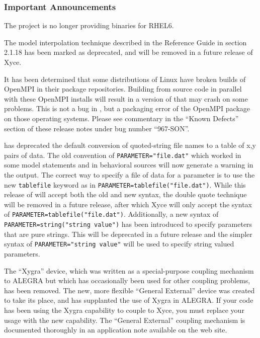 \documentclass[letterpaper]{scrartcl}
\begin{document}
\subsubsection*{Important Announcements}
\begin{XyceItemize}
\item The \Xyce{} project is no longer providing binaries for RHEL6.
\item The model interpolation technique described in the \Xyce{}
  Reference Guide in section 2.1.18 has been marked as deprecated, and
  will be removed in a future release of Xyce.
\item It has been determined that some distributions of Linux have
  broken builds of OpenMPI in their package repositories.  Building
  \Xyce{} from source code in parallel with these OpenMPI installs
  will result in a version of \Xyce{} that may crash on some problems.
  This is not a bug in \Xyce{}, but a packaging error of the OpenMPI
  package on those operating systems.  Please see commentary in the
  ``Known Defects'' section of these release notes under bug number
  ``967-SON''.
\item \Xyce{} has deprecated the default conversion of quoted-string file
  names to a table of x,y pairs of data.  The old convention of
  \texttt{PARAMETER="file.dat"} which worked in some model statements
  and in behavioral sources will now generate a warning in the \Xyce{}
  output.  The correct way to specify a file of data for a parameter
  is to use the new \texttt{tablefile} keyword as in
  \texttt{PARAMETER=tablefile("file.dat")}.  While this release of
  \Xyce{} will accept both the old and new syntax, the double quote
  technique will be removed in a future release, after which Xyce
  will only accept the syntax of
  \texttt{PARAMETER=tablefile("file.dat")}.  Additionally, a new
  syntax of \texttt{PARAMETER=string("string value")} has been
  introduced to specify parameters that are pure strings.  This will
  be deprecated in a future release and the simpler syntax of
  \texttt{PARAMETER="string value"} will be used to specify string
  valued parameters.
\item The ``Xygra'' device, which was written as a special-purpose
  coupling mechanism to ALEGRA but which has occasionally been used
  for other coupling problems, has been removed.  The new, more
  flexible ``General External'' device was created to take its place,
  and has supplanted the use of Xygra in ALEGRA.  If your code has
  been using the Xygra capability to couple to Xyce, you must replace
  your usage with the new capability.  The ``General External''
  coupling mechanism is documented thoroughly in an application note
  available on the \Xyce{} web site.
\end{XyceItemize}
\end{document}
